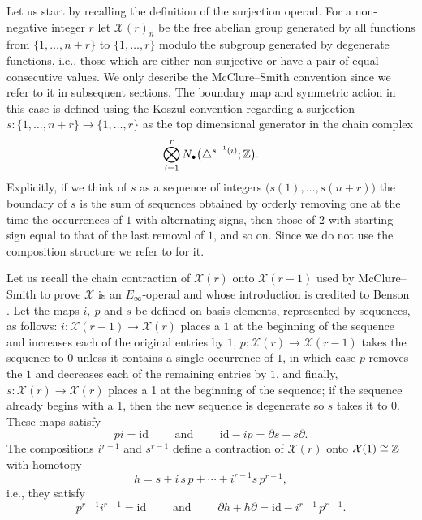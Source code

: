 Let us start by recalling the definition of the surjection operad.
For a non-negative integer $r$ let $\mathcal X(r)_n$ be the free abelian group generated by all functions from $\{1, \dots, n+r\}$ to $\{1, \dots, r\}$ modulo the subgroup generated by degenerate functions, i.e., those which are either non-surjective or have a pair of equal consecutive values.
We only describe the McClure--Smith convention since we refer to it in subsequent sections.
The boundary map and symmetric action in this case is defined using the Koszul convention regarding a surjection $s \colon \{1, \dots, n+r\} \to \{1, \dots, r\} $ as the top dimensional generator in the chain complex
\begin{equation} \label{eq: surjection boundary}
\bigotimes_{i = 1}^r N_\bullet \big( \triangle^{s^{-1}(i)}; \mathbb{Z} \big).
\end{equation}
Explicitly, if we think of $s$ as a sequence of integers $\big( s(1), \dots, s(n+r) \big)$ the boundary of $s$ is the sum of sequences obtained by orderly removing one at the time the occurrences of $1$ with alternating signs, then those of $2$ with starting sign equal to that of the last removal of $1$, and so on.
Since we do not use the composition structure we refer to \cite{mcclure2003multivariable} for it.

Let us recall the chain contraction of $\mathcal X(r)$ onto $\mathcal X(r-1)$ used by McClure--Smith to prove $\mathcal X$ is an $E_\infty$-operad and whose introduction is credited to Benson \cite{benson1998rep}.
Let the maps $i,\ p$ and $s$ be defined on basis elements, represented by sequences, as follows: $i \colon \mathcal X(r-1) \to \mathcal X(r)$ places a $1$ at the beginning of the sequence and increases each of the original entries by $1$, $p \colon \mathcal X(r) \to \mathcal X(r-1)$ takes the sequence to $0$ unless it contains a single occurrence of $1$, in which case $p$ removes the $1$ and decreases each of the remaining entries by $1$, and finally, $s \colon \mathcal X(r) \to \mathcal X(r)$ places a 1 at the beginning of the sequence; if the sequence already begins
with a 1, then the new sequence is degenerate so $s$ takes it to $0$.
These maps satisfy
\begin{equation*}
p i = \mathrm{id}
\qquad \text{ and } \qquad
\mathrm{id} - i p = \partial s + s \partial.
\end{equation*}
The compositions $i^{r-1}$ and $s^{r-1}$ define a contraction of $\mathcal X(r)$ onto $\mathcal X(1) \cong \mathbb{Z}$ with homotopy
\begin{equation*}
h = s + i\, s\, p + \cdots + i^{r-1} s\, p^{r-1},
\end{equation*}
i.e., they satisfy
\begin{equation*}
p^{r-1} i^{r-1} = \mathrm{id}
\qquad \text{ and } \qquad
\partial h + h \partial = \mathrm{id} - i^{r-1}\,p^{r-1}.
\end{equation*}

